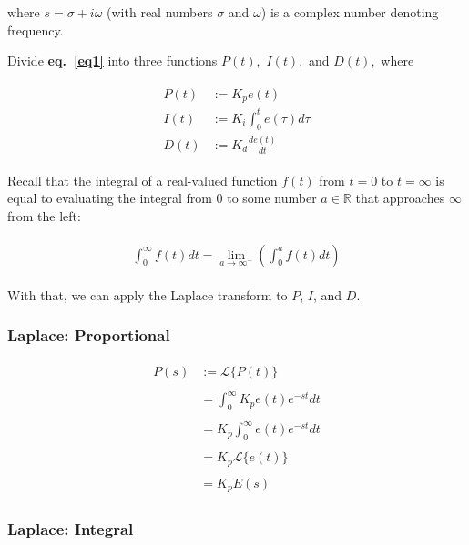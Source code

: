 \documentclass[11pt]{article}
\newcommand{\R}{\mathbb{R}}
\theoremstyle{definition}
\begin{document}
where $s = \sigma + i\omega$ (with real numbers $\sigma$ and $\omega$) is a complex number denoting frequency.

Divide \textbf{eq.~\ref{eq1}} into three functions $P(t),$ $I(t),$ and $D(t),$ where

\begin{align*}
\begin{split}
    P(t) &:= K_{p}e(t) \\
    I(t) &:= K_{i}\int_{0}^{t}e(\tau)d\tau \\
    D(t) &:= K_{d}\frac{de(t)}{dt}
\end{split}
\end{align*}

Recall that the integral of a real-valued function $f(t)$ from $t = 0$ to $t = \infty$ is equal to evaluating the integral
from $0$ to some number $a \in \R$ that approaches $\infty$ from the left:

\begin{align*}
\begin{split}
    \int_{0}^{\infty}f(t)dt = \lim_{a\to\infty^{-}}\left(\int_{0}^{a}f(t)dt\right)
\end{split}
\end{align*}


With that, we can apply the Laplace transform to $P$, $I$, and $D$.

\subsubsection{Laplace: Proportional}

\begin{align*}
    \begin{split}
        P(s) &:= \mathcal{L}\{P(t)\} \\\\
             &= \int_{0}^{\infty} K_{p}e(t)e^{-st}dt \\\\
             &= K_{p}\int_{0}^{\infty}e(t)e^{-st}dt \\\\
             &= K_{p}\mathcal{L}\{e(t)\} \\\\
             &= K_{p}E(s)
    \end{split}
\end{align*}

\subsubsection{Laplace: Integral}
\end{document}
